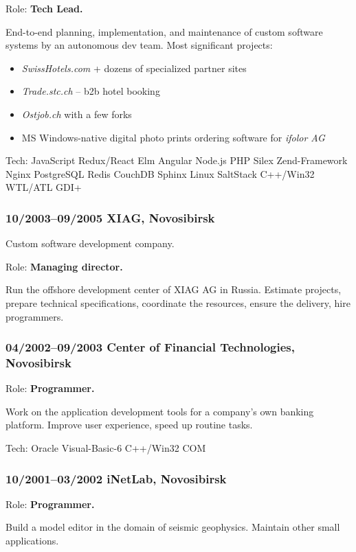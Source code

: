 \documentclass[a4paper, twocolumn, 10pt]{article}
\begin{document}
Role: \textbf{Tech Lead.}

End-to-end planning, implementation, and maintenance of custom software systems by an autonomous dev
team. Most significant projects:

\begin{itemize}
  \itemsep0em
  \item \emph{SwissHotels.com} + dozens of specialized partner sites
  \item \emph{Trade.stc.ch} -- b2b hotel booking
  \item \emph{Ostjob.ch} with a few forks
  \item MS Windows-native digital photo prints ordering software for \emph{ifolor AG}
\end{itemize}

Tech: JavaScript Redux/React Elm Angular Node.js PHP Silex Zend-Framework Nginx PostgreSQL
Redis CouchDB Sphinx Linux SaltStack C++/Win32 WTL/ATL GDI+

\subsubsection*{10/2003--09/2005 XIAG, Novosibirsk}

Custom software development company.

Role: \textbf{Managing director.}

Run the offshore development center of XIAG AG in Russia. Estimate projects, prepare technical
specifications, coordinate the resources, ensure the delivery, hire programmers.

\subsubsection*{04/2002--09/2003 Center of Financial Technologies, Novosibirsk}

Role: \textbf{Programmer.}

Work on the application development tools for a company's own banking platform. Improve user
experience, speed up routine tasks.

Tech: Oracle Visual-Basic-6 C++/Win32 COM

\subsubsection*{10/2001--03/2002 iNetLab, Novosibirsk}

Role: \textbf{Programmer.}

Build a model editor in the domain of seismic geophysics. Maintain other small applications.
\end{document}
